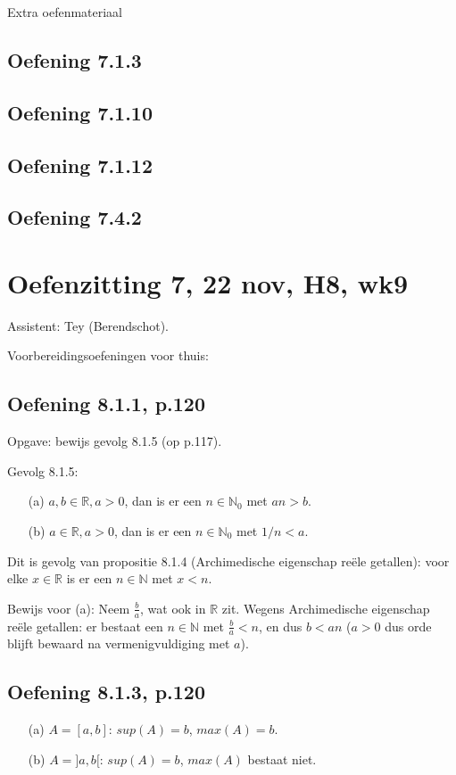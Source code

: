 \documentclass{article}
\begin{document}
Extra oefenmateriaal 


\subsection*{Oefening 7.1.3}
\subsection*{Oefening 7.1.10}
\subsection*{Oefening 7.1.12}
\subsection*{Oefening 7.4.2 }


\section{Oefenzitting 7, 22 nov, H8, wk9}

Assistent: Tey (Berendschot). 


Voorbereidingsoefeningen voor thuis: 

\subsection{Oefening 8.1.1, p.120}
Opgave: bewijs gevolg 8.1.5 (op p.117). 

Gevolg 8.1.5: 
\begin{itemize}
    \item [(a)] $a,b \in \mathbb{R}, a>0$, dan is er een $n \in \mathbb{N}_0 $ met $an>b$. 
    \item [(b)] $a \in \mathbb{R}, a>0 $, dan is er een $n \in \mathbb{N}_0 $ met $1/n < a$. 
\end{itemize}

Dit is gevolg van propositie 8.1.4 (Archimedische eigenschap re\"ele getallen): voor elke $x \in \mathbb{R}$ is er een $n \in \mathbb{N}$ met $x<n$. 

Bewijs voor (a): Neem $\frac{b}{a}$, wat ook in $\mathbb{R}$ zit. Wegens Archimedische eigenschap  re\"ele getallen: er bestaat een $n \in \mathbb{N}$ met $\frac{b}{a}<n$, en dus $b<an$ ($a>0$ dus orde blijft bewaard na vermenigvuldiging met $a$). 


\subsection{Oefening 8.1.3, p.120}
\begin{itemize}
    \item [(a)] $A= [ a,b ] $: $sup (A)=b$, $max (A)=b$. 
    \item [(b)] $A= ] a,b [ $: $sup (A)=b$, $max (A)$ bestaat niet. 
\end{itemize}
\end{document}
